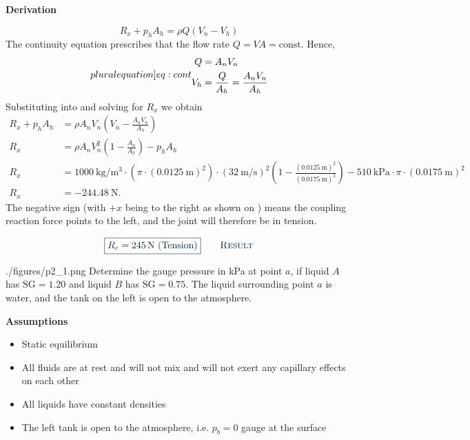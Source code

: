 \documentclass[a4paper]{article}
\newcounter{problem}
\numberwithin{equation}{problem}
\newcommand{\AUheading}[1]{%
  \par\vspace{.4\baselineskip}%
  {\sffamily\bfseries\color{AUblueDark}#1\par}%
  \nobreak%
}
\newenvironment{assumptions}[1][Assumptions]{%
  \AUheading{#1}
  \begin{itemize}[leftmargin=*,nosep]
}{\end{itemize}\par\medskip}
\newenvironment{derivation}[1][Derivation]{%
  \AUheading{#1}
  \begingroup\allowdisplaybreaks
  \setlength{\abovedisplayskip}{6pt}%
  \setlength{\belowdisplayskip}{6pt}%
  \setlength{\abovedisplayshortskip}{4pt}%
  \setlength{\belowdisplayshortskip}{4pt}%
}{\par\endgroup\medskip}
\newcommand{\finalresult}[1]{%
  \vspace{.2\baselineskip}%
  \begin{equation}
    {\color{AUblueDark}\boxed{\displaystyle #1}}
    \tag*{\textsc{\textcolor{AUblueDark}{Result}}}
  \end{equation}
  \newpage
}
\begin{document}
\begin{derivation}
\begin{equation} \label{eq:momste1dsubred}
  R_x + p_h A_h = \rho Q \left( V_n - V_h \right)
\end{equation}
The continuity equation prescribes that the flow rate $Q = V A = \mathrm{const.}$
Hence,
\begin{subequations} \label[pluralequation]{eq:cont}
  \begin{align}
  Q &= A_n V_n \label{eq:conta}\\
  V_h &= \frac{Q}{A_h} = \frac{A_n V_n}{A_h}
\end{align}
\end{subequations}
Substituting  into  and solving for $R_x$ we obtain
\begin{align*}
  R_x + p_h A_h &= \rho A_n V_n \left( V_n - \frac{A_n V_n}{A_h} \right) \\
  R_x &= \rho A_n V_n^2 \left( 1 - \frac{A_n}{A_h} \right) - p_h A_h \\
  R_x &= \qty{1000}{\kilogram\per\cubic\meter} \cdot \left( \pi \cdot \left( \qty{0,0125}{\meter}  \right)^2 \right) \cdot \left( \qty{32}{\meter\per\second}  \right)^2 \left( 1 - \frac{ \left( \qty{0,0125}{\meter}  \right)^2 }{\left( \qty{0,0175}{\meter}  \right)^2} \right) - \qty{510}{\kilo\pascal} \cdot \pi \cdot \left( \qty{0,0175}{\meter} \right)^2 \\
  R_x &= \qty{-244,48}{\newton} 
.\end{align*}
The negative sign (with $+x$ being to the right as shown on ) means the coupling reaction force points to the left, and the joint will therefore be in tension.
\end{derivation}

\finalresult{R_c = \qty{245}{\newton} \, \left( \text{Tension} \right)}


\begin{problemwithimage}[0.35\linewidth]{./figures/p2_1.png}
  Determine the gauge pressure in \unit{\kilo\pascal} at point $a$, if liquid $A$ has $\mathrm{SG} = \num{1,20} $ and liquid $B$ has $\mathrm{SG} = \num{0,75}$.
  The liquid surrounding point $a$ is water, and the tank on the left is open to the atmosphere.
\end{problemwithimage}

\begin{assumptions}
  \item Static equilibrium
  \item All fluids are at rest and will not mix and will not exert any capillary effects on each other
  \item All liquids have constant densities 
  \item The left tank is open to the atmosphere, i.e. $p_b = 0$ gauge at the surface
\end{assumptions}
\end{document}
